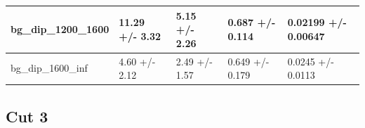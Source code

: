 \documentclass[a4paper, 10pt]{article}
\begin{document}
\begin{table}[H]
\begin{center}
\begin{tabular}{|m{20.0mm}|m{27.0mm}|m{27.0mm}|m{33.0mm}|m{32.0mm}|}
      \hline
      {\cellcolor{white}         bg\_dip\_1200\_1600}& {\cellcolor{white}         11.29 +/\-- 3.32}& {\cellcolor{white}         5.15 +/\-- 2.26}& {\cellcolor{white}         0.687 +/\-- 0.114}& {\cellcolor{white}         0.02199 +/\-- 0.00647}\\
      \hline
      {\cellcolor{white}         bg\_dip\_1600\_inf}& {\cellcolor{white}         4.60 +/\-- 2.12}& {\cellcolor{white}         2.49 +/\-- 1.57}& {\cellcolor{white}         0.649 +/\-- 0.179}& {\cellcolor{white}         0.0245 +/\-- 0.0113}\\
\hline
    \end{tabular}
  \end{center}
\end{table}

   \newpage
\subsection{Cut 3}
\end{document}
